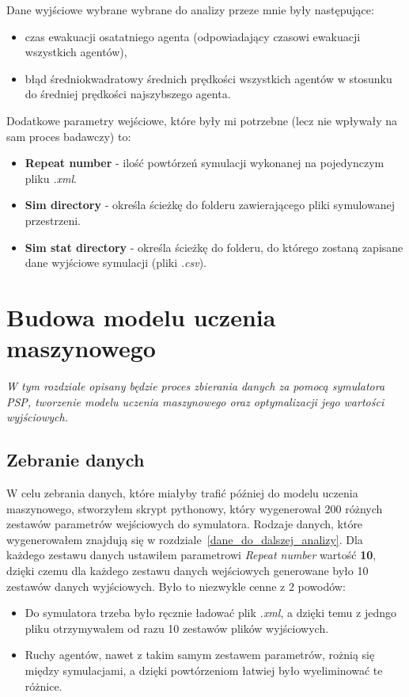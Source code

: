 \documentclass[12pt]{aghdpl}
\begin{document}
		Dane wyjściowe wybrane wybrane do analizy przeze mnie były następujące:
		
		\begin{itemize}
		\item czas ewakuacji osatatniego agenta (odpowiadający czasowi ewakuacji wszystkich agentów),
		\item błąd średniokwadratowy średnich prędkości wszystkich agentów w stosunku do średniej prędkości najszybszego agenta.
		\end{itemize}
		
		Dodatkowe parametry wejściowe, które były mi potrzebne (lecz nie wpływały na sam proces badawczy) to:
		\begin{itemize}
		\item \textbf{Repeat number} - ilość powtórzeń symulacji wykonanej na pojedynczym pliku \textit{.xml}.
		\item \textbf{Sim directory} - określa ścieżkę do folderu zawierającego pliki symulowanej przestrzeni.
		\item \textbf{Sim stat directory} - określa ścieżkę do folderu, do którego zostaną zapisane dane wyjściowe symulacji (pliki \textit{.csv}).
		\end{itemize}
		
	\newpage
	\chapter{Budowa modelu uczenia maszynowego}
	\textit{W tym rozdziale opisany będzie proces zbierania danych za pomocą symulatora PSP, tworzenie modelu uczenia maszynowego oraz optymalizacji jego wartości wyjściowych.}
	
		\section{Zebranie danych} \label{zebranie_danych}
		W celu zebrania danych, które miałyby trafić później do modelu uczenia maszynowego, stworzyłem skrypt pythonowy, który wygenerował 200 różnych zestawów parametrów wejściowych do symulatora. Rodzaje danych, które wygenerowałem znajdują się w rozdziale~\ref{dane_do_dalszej_analizy}. Dla każdego zestawu danych ustawiłem parametrowi \textit{Repeat number} wartość \textbf{10}, dzięki czemu dla każdego zestawu danych wejściowych generowane było 10 zestawów danych wyjściowych. Było to niezwykle cenne z 2 powodów:
		\begin{itemize}
		\item Do symulatora trzeba było ręcznie ładować plik \textit{.xml}, a dzięki temu z jedngo pliku otrzymywałem od razu 10 zestawów plików wyjściowych.
		\item Ruchy agentów, nawet z takim samym zestawem parametrów, rożnią się między symulacjami, a dzięki powtórzeniom łatwiej było wyeliminować te różnice.
		\end{itemize}
		
\end{document}
